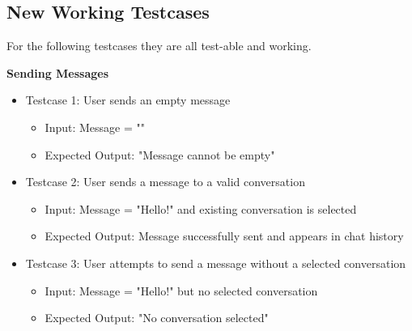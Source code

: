 \subsection{New Working Testcases}
For the following testcases they are all test-able and working.

\textbf{Sending Messages}
\begin{itemize}
    \item Testcase 1: User sends an empty message
    \begin{itemize}
        \item Input: Message = ""
        \item Expected Output: "Message cannot be empty"
    \end{itemize}

    \item Testcase 2: User sends a message to a valid conversation
    \begin{itemize}
        \item Input: Message = "Hello!" and existing conversation is selected
        \item Expected Output: Message successfully sent and appears in chat history
    \end{itemize}

    \item Testcase 3: User attempts to send a message without a selected conversation
    \begin{itemize}
        \item Input: Message = "Hello!" but no selected conversation
        \item Expected Output: "No conversation selected"
    \end{itemize}
\end{itemize}

